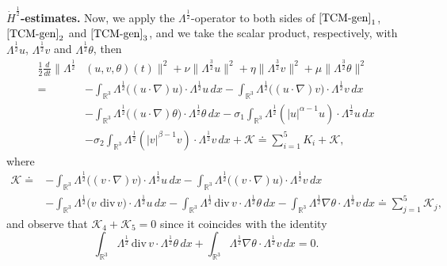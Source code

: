 \documentclass[a4paper]{article}
\newcommand{\dx}{\, dx}
\newcommand{\R}{\mathbb{R}}
\providecommand{\dv}{\,\mathrm{div}\,}
\begin{document}
\noindent \textbf{$\dot{H}^{\frac{1}{2}}$-estimates.}
Now, we apply the $\Lambda^{\frac{1}{2}}$-operator to both sides of
$\eqref{TCM-gen}_1$, $\eqref{TCM-gen}_2$ and $\eqref{TCM-gen}_3$, and
we take the scalar product, respectively, with
$\Lambda^{\frac{1}{2}}u$, $\Lambda^{\frac{1}{2}}v$ and
$\Lambda^{\frac{1}{2}}\theta$, then
%
\begin{equation} \label{H1/2-stima-diff}
  \begin{aligned}
    \frac{1}{2} \frac{d}{dt} \|\Lambda^{\frac{1}{2}} & (u, v, \theta)
    (t) \|^2 + \nu\|\Lambda^{\frac{3}{2}} u\|^2 + \eta
    \|\Lambda^{\frac{3}{2}} v\|^2 + \mu \|\Lambda^{\frac{3}{2}}
    \theta\|^2
    \\
    = & -\int_{\R^3}\Lambda^{\frac{1}{2}}\big( (u\cdot \nabla) u\big)
    \cdot \Lambda^{\frac{1}{2}}u \dx -
    \int_{\R^3}\Lambda^{\frac{1}{2}}\big( (u\cdot \nabla) v\big) \cdot
    \Lambda^{\frac{1}{2}}v \dx
    \\
    & - \int_{\R^3}\Lambda^{\frac{1}{2}}\big( (u \cdot \nabla)
    \theta\big) \cdot \Lambda^{\frac{1}{2}}\theta \dx -
    \sigma_1\int_{\R^3}\Lambda^{\frac{1}{2}}(|u|^{\alpha-1}u)\cdot
    \Lambda^{\frac{1}{2}} u \dx\\
    & - \sigma_2\int_{\R^3}\Lambda^{\frac{1}{2}}(|v|^{\beta-1}v)\cdot
    \Lambda^{\frac{1}{2}} v \dx +\mathcal{K}\doteq \sum_{i=1}^5 K_i
    +\mathcal{K},
  \end{aligned}
\end{equation}
where
%
\begin{equation*}
  \begin{aligned}
    \mathcal{K}\doteq & -\int_{\R^3}\Lambda^{\frac{1}{2}}\big( (v\cdot
    \nabla) v\big) \cdot \Lambda^{\frac{1}{2}}u \dx -
    \int_{\R^3}\Lambda^{\frac{1}{2}}\big( (v\cdot \nabla) u\big) \cdot
    \Lambda^{\frac{1}{2}}v \dx
    \\
    & - \int_{\R^3}\Lambda^{\frac{1}{2}}\big( v \,\dv v\big)\cdot
    \Lambda^{\frac{1}{2}} u \dx - \int_{\R^3} \Lambda^{\frac{1}{2}}
    \dv v\cdot \Lambda^{\frac{1}{2}} \theta \dx - \int_{\R^3}
    \Lambda^{\frac{1}{2}} \nabla \theta\cdot \Lambda^{\frac{1}{2}} v
    \dx\doteq \sum_{j=1}^5\mathcal{K}_j,
  \end{aligned}
\end{equation*}
and observe that $\mathcal{K}_4+\mathcal{K}_5=0$
  since it coincides with the identity
%
  \begin{equation} \label{ultima-relazione-aggiunta}
 \int_{\R^3}  \Lambda^{\frac12} \dv v\cdot  \Lambda^{\frac12} \theta
 \dx + \int_{\R^3} \Lambda^{\frac12}\nabla \theta \cdot
 \Lambda^{\frac12} v \dx =0.
\end{equation}
\end{document}
